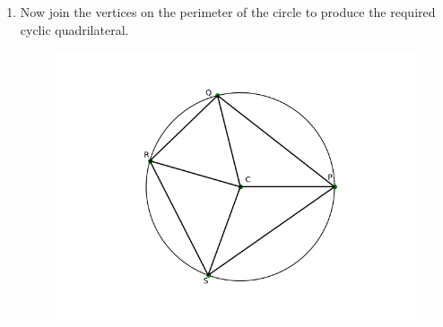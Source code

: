 \documentclass[8pt, twocolumn]{article}
\begin{document}
\begin{enumerate}
\begin{figure}[ht]
\end{figure}
\item Now join the vertices on the perimeter of the circle to produce the required cyclic quadrilateral.
\begin{figure}[ht]
    \centering
    \includegraphics[scale = 0.4]{figs/cnstrct_fig3.png}
\end{figure}

\end{enumerate}
\end{document}
